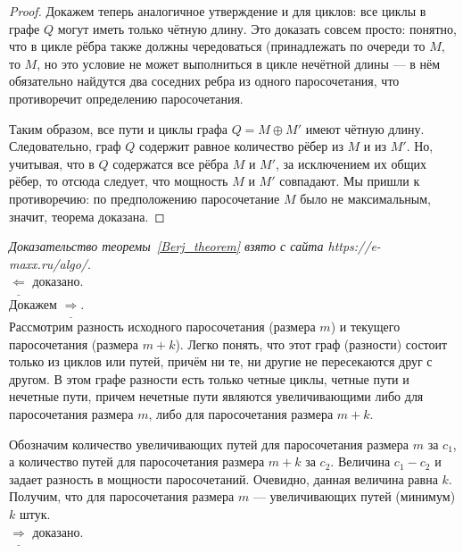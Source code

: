 \begin{solution}
\begin{proof}
Докажем теперь аналогичное утверждение и для циклов: все циклы в графе $Q$ могут иметь только чётную длину. Это доказать совсем просто: понятно, что в цикле рёбра также должны чередоваться (принадлежать по очереди то $M$, то $M$, но это условие не может выполниться в цикле нечётной длины — в нём обязательно найдутся два соседних ребра из одного паросочетания, что противоречит определению паросочетания.\par

Таким образом, все пути и циклы графа $Q = M \oplus{M'}$ имеют чётную длину. Следовательно, граф $Q$ содержит равное количество рёбер из $M$ и из $M'$. Но, учитывая, что в $Q$ содержатся все рёбра $M$ и $M'$, за исключением их общих рёбер, то отсюда следует, что мощность $M$ и $M'$ совпадают. Мы пришли к противоречию: по предположению паросочетание $M$ было не максимальным, значит, теорема доказана.
\end{proof}

\emph{Доказательство теоремы~\ref{Berj_theorem} взято с сайта https://e-maxx.ru/algo/}. \\
$\underline{\Leftarrow}$ доказано. \\

Докажем $\underline{\Rightarrow}$. \\
Рассмотрим разность исходного паросочетания (размера $m$) и текущего паросочетания (размера $m + k$). Легко понять, что этот граф (разности) состоит только из циклов или путей, причём ни те, ни другие не пересекаются друг с другом.
В этом графе разности есть только четные циклы, четные пути и нечетные пути, причем нечетные пути являются увеличивающими либо для паросочетания размера $m$, либо для паросочетания размера $m + k$. \par
Обозначим количество увеличивающих путей для паросочетания размера $m$ за $c_1$, а количество путей для паросочетания размера $m+k$ за $c_2$. Величина $c_1 - c_2$ и задает разность в мощности паросочетаний. Очевидно, данная величина равна $k$. Получим, что для паросочетания размера $m$ --- увеличивающих путей (минимум) $k$ штук. \\
$\underline{\Rightarrow}$ доказано.

\end{solution}
